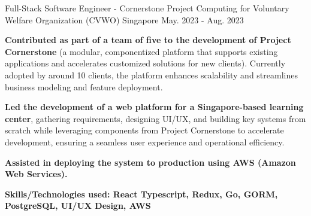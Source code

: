 

\begin{cventries}

  \cventry
    {Full-Stack Software Engineer - Cornerstone Project} %
    {Computing for Voluntary Welfare Organization (CVWO)} %
    {Singapore} %
    {May. 2023 - Aug. 2023} %
    {
      \begin{cvitems}
        \item {\textbf{Contributed as part of a team of five to the development of Project Cornerstone} (a modular, componentized platform that supports existing applications and accelerates customized solutions for new clients). Currently adopted by around 10 clients, the platform enhances scalability and streamlines business modeling and feature deployment.}
        \item {\textbf{Led the development of a web platform for a Singapore-based learning center}, gathering requirements, designing UI/UX, and building key systems from scratch while leveraging components from Project Cornerstone to accelerate development, ensuring a seamless user experience and operational efficiency.}
        \item {\textbf{Assisted in deploying the system to production using AWS (Amazon Web Services).}}
      \end{cvitems}
    }
    {\textbf{Skills/Technologies used: React Typescript, Redux, Go, GORM, PostgreSQL, UI/UX Design, AWS}}

\end{cventries}
